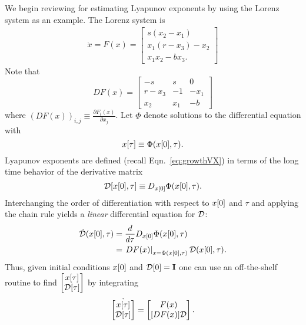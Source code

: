 We begin reviewing \cite{Benettin80} for
estimating Lyapunov exponents by using the Lorenz system as an
example.  The Lorenz system is
\begin{align*}
  \dot x = F(x) = 
  \begin{bmatrix}
    s(x_2-x_1)\\ x_1(r - x_3) -x_2 \\ x_1 x_2 - bx_3.
  \end{bmatrix}
\end{align*}
Note that
\begin{equation*}
  D F(x) = 
  \begin{bmatrix}
    -s & s & 0 \\ r-x_3 & -1 & -x_1 \\ x_2 & x_1 & -b
  \end{bmatrix}
\end{equation*}
where $\left(D F(x)\right)_{i,j} \equiv \frac{\partial F_i(x)}{\partial
  x_j}$.  Let $\Phi$ denote solutions to the differential equation
with
\newcommand{\DM}{{\cal{D}}} %
\newcommand{\ct}{\tau}      %
\begin{equation*}
  \ti{x}{\ct} \equiv \Phi(\ti{x}{0},\ct).
\end{equation*}
Lyapunov exponents are defined (recall Eqn.~\eqref{eq:growthVX}) in
terms of the long time behavior of the derivative matrix
\begin{equation*}
  \ti{\DM}{\ti{x}{0},\ct} \equiv D_{\ti{x}{0}} \Phi(\ti{x}{0},\ct).
\end{equation*}
Interchanging the order of differentiation with respect to ${x}{[0]}$
and $\ct$ and applying the chain rule yields a \emph{linear}
differential equation for $\DM$:
\begin{align*}
  \dot \DM(\ti{x}{0},\ct) &=  \frac{d}{d\ct} D_{\ti{x}{0}}
  \Phi(\ti{x}{0},\ct)\\
  &= \left. D F(x) \right|_{x=\Phi(\ti{x}{0},\ct)}
  \DM(\ti{x}{0},\ct).
\end{align*}
Thus, given initial conditions ${x}{[0]}$ and $\ti{\DM}{0} = \id $
one can  use an off-the-shelf routine to find $\begin{bmatrix}
  \ti{x}{\ct}\\ \ti{\DM}{\ct}\end{bmatrix}$ by integrating 
\begin{equation}
  \label{eq:TangentODE}
  \dot {\begin{bmatrix} \ti{x}{\ct}\\\ti{\DM}{\ct}\end{bmatrix}} = 
  \begin{bmatrix}
    F(x) \\  [D F(x)] \DM
  \end{bmatrix}.
\end{equation}

